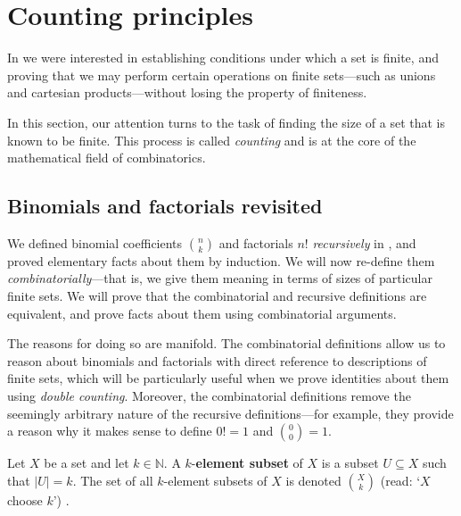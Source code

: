 \section{Counting principles}


In  we were interested in establishing conditions under which a set is finite, and proving that we may perform certain operations on finite sets---such as unions and cartesian products---without losing the property of finiteness.

In this section, our attention turns to the task of finding the size of a set that is known to be finite. This process is called \textit{counting} and is at the core of the mathematical field of combinatorics.

\subsection*{Binomials and factorials revisited}
We defined binomial coefficients $\binom{n}{k}$ and factorials $n!$ \textit{recursively} in , and proved elementary facts about them by induction. We will now re-define them \textit{combinatorially}---that is, we give them meaning in terms of sizes of particular finite sets. We will prove that the combinatorial and recursive definitions are equivalent, and prove facts about them using combinatorial arguments.

The reasons for doing so are manifold. The combinatorial definitions allow us to reason about binomials and factorials with direct reference to descriptions of finite sets, which will be particularly useful when we prove identities about them using
\textit{double counting}.
Moreover, the combinatorial definitions remove the seemingly arbitrary nature of the recursive definitions---for example, they provide a reason why it makes sense to define $0!=1$ and $\binom{0}{0}=1$.

\begin{definition}
\label{defXChoosek}
Let $X$ be a set and let $k \in \mathbb{N}$. A $k$-\textbf{element subset} of $X$ is a subset $U \subseteq X$ such that $|U|=k$. The set of all $k$-element subsets of $X$ is denoted $\binom{X}{k}$ (read: `$X$ choose $k$') .
\end{definition}

